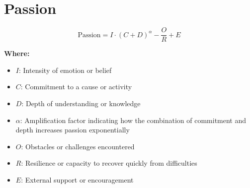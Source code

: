 \chapter{Passion}

\begin{equation}
\text{Passion} = I \cdot (C + D)^\alpha - \frac{O}{R} + E
\end{equation}

\textbf{Where:}

\begin{itemize}
    \item $I$: Intensity of emotion or belief
    \item $C$: Commitment to a cause or activity
    \item $D$: Depth of understanding or knowledge
    \item $\alpha$: Amplification factor indicating how the combination of commitment and depth increases passion exponentially
    \item $O$: Obstacles or challenges encountered
    \item $R$: Resilience or capacity to recover quickly from difficulties
    \item $E$: External support or encouragement
\end{itemize}
